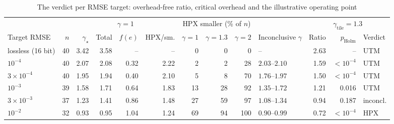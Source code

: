 \begin{table}[t]
\centering
\caption{The verdict per RMSE target: overhead-free ratio, critical overhead and the illustrative operating point}
\label{tab:synthesis}
\footnotesize
\setlength{\tabcolsep}{3pt}
\begin{tabular}{@{}lrrrrrrrrlrrl@{}}
\toprule
 & & \multicolumn{4}{c}{$\gamma=1$} & \multicolumn{3}{c}{HPX smaller (\% of $n$)} & & \multicolumn{3}{c}{$\gamma_{\mathrm{tile}}=1.3$} \\
\cmidrule(lr){3-6}\cmidrule(lr){7-9}\cmidrule(lr){11-13}
Target RMSE & $n$ & $\gamma_\star$ & Total & $f(e)$ &  HPX/sm. & $\gamma{=}1$ & $\gamma{=}1.3$ & $\gamma{=}2$ & Inconclusive $\gamma$ & Ratio & $p_{\mathrm{Holm}}$ & Verdict \\
\midrule
lossless (16 bit) & 40 & 3.42 & 3.58 & -- & -- & 0 & 0 & 0 & -- & 2.63 & -- & UTM \\
$10^{-4}$ & 40 & 2.07 & 2.08 & 0.32 & 2.22 & 2 & 2 & 28 & $2.03$--$2.10$ & 1.59 & $<10^{-4}$ & UTM \\
$3\times10^{-4}$ & 40 & 1.95 & 1.94 & 0.40 & 2.10 & 5 & 8 & 70 & $1.76$--$1.97$ & 1.50 & $<10^{-4}$ & UTM \\
$10^{-3}$ & 39 & 1.58 & 1.71 & 0.64 & 1.83 & 13 & 28 & 92 & $1.35$--$1.72$ & 1.21 & 0.016 & UTM \\
$3\times10^{-3}$ & 37 & 1.23 & 1.41 & 0.86 & 1.48 & 27 & 59 & 97 & $1.08$--$1.34$ & 0.94 & 0.187 & inconcl. \\
$10^{-2}$ & 32 & 0.93 & 0.95 & 1.04 & 1.24 & 69 & 94 & 100 & $0.90$--$0.99$ & 0.72 & $<10^{-4}$ & HPX \\
\bottomrule
\end{tabular}

\end{table}
